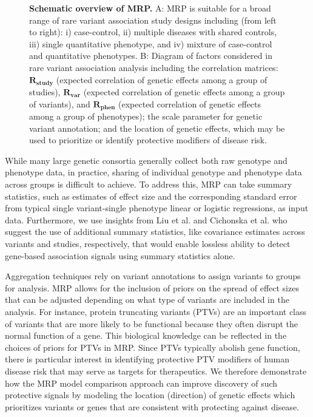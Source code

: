\begin{figure}[!h]
\caption{{\bf Schematic overview of MRP.}
A: MRP is suitable for a broad range of rare variant association study designs including (from left to right): i) case-control, ii) multiple diseases with shared controls, iii) single quantitative phenotype, and iv) mixture of case-control and quantitative phenotypes. B: Diagram of factors considered in rare variant association analysis including the correlation matrices: $\mathbf{R_{\textrm{study}}}$  (expected correlation of genetic effects among a group of studies), $\mathbf{R_{\textrm{var}}}$ (expected correlation of genetic effects among a group of variants), and $\mathbf{R_{\textrm{phen}}}$ (expected correlation of genetic effects among a group of phenotypes); the scale parameter for genetic variant annotation; and the location of genetic effects, which may be used to prioritize or identify protective modifiers of disease risk.}
\label{fig1}
\end{figure}

While many large genetic consortia generally collect both raw genotype and phenotype data, in practice, sharing of individual genotype and phenotype data across groups is difficult to achieve. To address this, MRP can take summary statistics, such as estimates of effect size and the corresponding standard error from typical single variant-single phenotype linear or logistic regressions, as input data. Furthermore, we use insights from Liu et al.\cite{liu2014meta} and Cichonska et al.\cite{cichonska2016metacca} who suggest the use of additional summary statistics, like covariance estimates across variants and studies, respectively, that would enable lossless ability to detect gene-based association signals using summary statistics alone.  

Aggregation techniques rely on variant annotations to assign variants to groups for analysis. MRP allows for the inclusion of priors on the spread of effect sizes that can be adjusted depending on what type of variants are included in the analysis. For instance, protein truncating variants (PTVs)\cite{rivas2013assessing,rivas2015effect} are an important class of variants that are more likely to be functional because they often disrupt the normal function of a gene. This biological knowledge can be reflected in the choices of priors for PTVs in MRP. Since PTVs typically abolish gene function, there is particular interest in identifying protective PTV modifiers of human disease risk that may serve as targets for therapeutics\cite{pcsk9,cohen2006sequence,sullivan2012effect}. We therefore demonstrate how the MRP model comparison approach can improve discovery of such protective signals by modeling the location (direction) of genetic effects which prioritizes variants or genes that are consistent with protecting against disease. 

